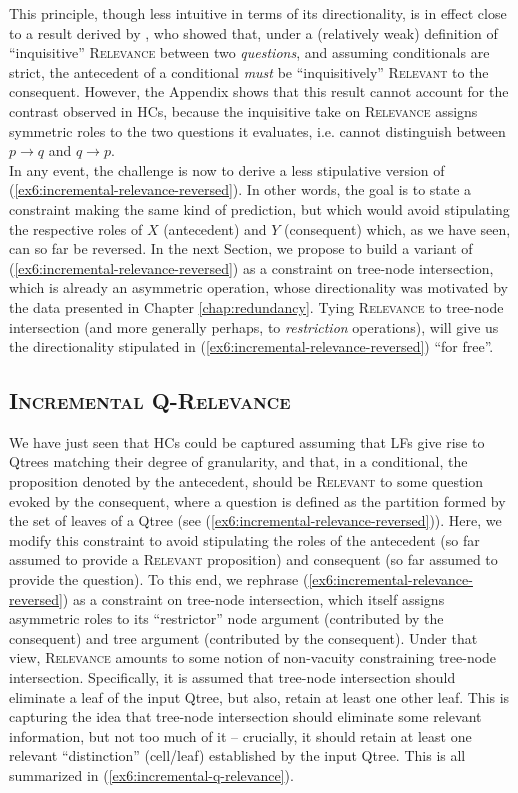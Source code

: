 This principle, though less intuitive in terms of its directionality, is in effect close to a result derived by \citet{Lewis1988}, who showed that, under a (relatively weak) definition of ``inquisitive'' \textsc{Relevance} between two \textit{questions}, and assuming conditionals are strict, the antecedent of a conditional \textit{must} be ``inquisitively'' \textsc{Relevant} to the consequent. However, the Appendix shows that this result cannot account for the contrast observed in HCs, because the inquisitive take on \textsc{Relevance} assigns symmetric roles to the two questions it evaluates, i.e. cannot distinguish between $p \rightarrow q$ and $q \rightarrow p$.\\

In any event, the challenge is now to derive a less stipulative version of (\ref{ex6:incremental-relevance-reversed}). In other words, the goal is to state a constraint making the same kind of prediction, but which would avoid stipulating the respective roles of $X$ (antecedent) and $Y$ (consequent) which, as we have seen, can so far be reversed. In the next Section, we propose to build a variant of (\ref{ex6:incremental-relevance-reversed}) as a constraint on tree-node intersection, which is already an asymmetric operation, whose directionality was motivated by the data presented in Chapter \ref{chap:redundancy}. Tying \textsc{Relevance} to tree-node intersection (and more generally perhaps, to \textit{restriction} operations), will give us the directionality stipulated in (\ref{ex6:incremental-relevance-reversed}) ``for free''.

\subsection{\textsc{Incremental Q-Relevance}}

We have just seen that HCs could be captured assuming that LFs give rise to Qtrees matching their degree of granularity, and that, in a conditional, the proposition denoted by the antecedent, should be \textsc{Relevant} to some question evoked by the consequent, where a question is defined as the partition formed by the set of leaves of a Qtree (see (\ref{ex6:incremental-relevance-reversed})). Here, we modify this constraint to avoid stipulating the roles of the antecedent (so far assumed to provide a \textsc{Relevant} proposition) and consequent (so far assumed to provide the question). To this end, we rephrase (\ref{ex6:incremental-relevance-reversed}) as a constraint on tree-node intersection, which itself assigns asymmetric roles to its ``restrictor'' node argument (contributed by the consequent) and tree argument (contributed by the consequent). Under that view, \textsc{Relevance} amounts to some notion of non-vacuity constraining tree-node intersection. Specifically, it is assumed that tree-node intersection should eliminate a leaf of the input Qtree, but also, retain at least one other leaf. This is capturing the idea that tree-node intersection should eliminate some relevant information, but not too much of it -- crucially, it should retain at least one relevant ``distinction'' (cell/leaf) established by the input Qtree. This is all summarized in (\ref{ex6:incremental-q-relevance}).


